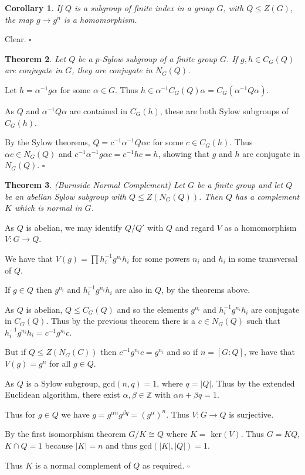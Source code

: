 \documentclass[10pt]{article}
\newcommand{\Z}{\mathbb{Z}}
\newtheorem{theorem}{Theorem}[section]
\newtheorem{corollary}[theorem]{Corollary}
\newenvironment{proof}[1][Proof]{\begin{trivlist}
\item[\hskip \labelsep {\itshape #1}]}{\end{trivlist}}
\begin{document}
\begin{corollary}
If $Q$ is a subgroup of finite index in a group $G$, with $Q \leq Z(G)$, the map $g \to g^n$ is a homomorphism.
\end{corollary}

\begin{proof}
Clear. $\square$
\end{proof}

\begin{theorem}
Let $Q$ be a $p$-Sylow subgroup of a finite group $G$. If $g, h \in C_G(Q)$ are conjugate in $G$, they are conjugate in $N_G(Q)$.
\end{theorem}

\begin{proof}
Let $h = \alpha^{-1}g\alpha$ for some $\alpha \in G$. Thus $h \in \alpha^{-1}C_G(Q)\alpha = C_G(\alpha^{-1}Q\alpha)$.

As $Q$ and $\alpha^{-1}Q\alpha$ are contained in $C_G(h)$, these are both Sylow subgroups of $C_G(h)$.

By the Sylow theorems, $Q = c^{-1}\alpha^{-1}Q\alpha c$ for some $c \in C_G(h)$. Thus $\alpha c \in N_G(Q)$ and $c^{-1}\alpha^{-1}g\alpha c = c^{-1}hc = h$, showing that $g$ and $h$ are conjugate in $N_G(Q)$. $\square$
\end{proof}

\begin{theorem} (Burnside Normal Complement)
Let $G$ be a finite group and let $Q$ be an abelian Sylow subgroup with $Q \leq Z(N_G(Q))$. Then $Q$ has a complement $K$ which is normal in $G$.
\end{theorem}

\begin{proof}
As $Q$ is abelian, we may identify $Q/Q'$ with $Q$ and regard $V$ as a homomorphism $V: G \to Q$.

We have that $V(g) = \prod h_i^{-1}g^{n_i}h_i$ for some powers $n_i$ and $h_i$ in some transversal of $Q$.

If $g \in Q$ then $g^{n_i}$ and $h_i^{-1}g^{n_i}h_i$ are also in $Q$, by the theorems above.

As $Q$ is abelian, $Q \leq C_G(Q)$ and so the elements $g^{n_i}$ and $h_i^{-1}g^{n_i}h_i$ are conjugate in $C_G(Q)$. Thus by the previous theorem there is a $c \in N_G(Q)$ such that $h_i^{-1}g^{n_i}h_i = c^{-1}g^{n_i}c$.

But if $Q \leq Z(N_G(C))$ then $c^{-1}g^{n_i}c = g^{n_i}$ and so if $n = [G:Q]$, we have that $V(g) = g^n$ for all $g \in Q$.

As $Q$ is a Sylow subgroup, gcd$(n, q) = 1$, where $q = |Q|$. Thus by the extended Euclidean algorithm, there exist $\alpha, \beta \in \Z$ with $\alpha n + \beta q = 1$.

Thus for $g \in Q$ we have $g = g^{\alpha n}g^{\beta q} = (g^\alpha)^n$. Thus $V : G \to Q$ is surjective.

By the first isomorphism theorem $G/K \cong Q$ where $K =$ ker$(V)$. Thus $G = KQ$, $K\cap Q = 1$ because $|K| = n$ and thus gcd$(|K|, |Q|) = 1$.

Thus $K$ is a normal complement of $Q$ as required. $\square$
\end{proof}
\end{document}
